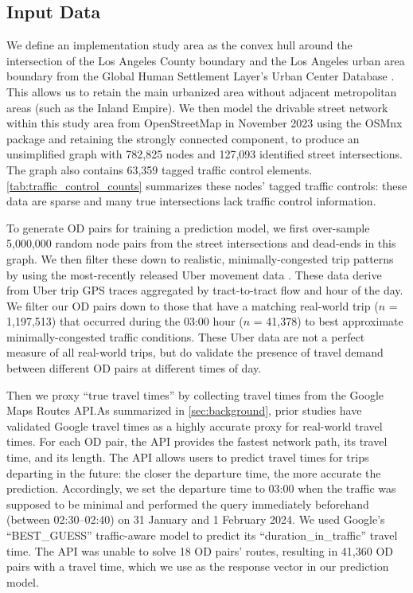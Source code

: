 \documentclass[12pt,letterpaper]{article} %
\begin{document}
\subsection{Input Data}

We define an implementation study area as the convex hull around the intersection of the Los Angeles County boundary and the Los Angeles urban area boundary from the Global Human Settlement Layer's Urban Center Database \citep{florczyk2019description, GHS2019}. This allows us to retain the main urbanized area without adjacent metropolitan areas (such as the Inland Empire). We then model the drivable street network within this study area from OpenStreetMap in November 2023 using the OSMnx package \citep{boeing_modeling_2025} and retaining the strongly connected component, to produce an unsimplified graph with 782,825 nodes and 127,093 identified street intersections. The graph also contains 63,359 tagged traffic control elements. \autoref{tab:traffic_control_counts} summarizes these nodes' tagged traffic controls: these data are sparse and many true intersections lack traffic control information.

To generate OD pairs for training a prediction model, we first over-sample 5,000,000 random node pairs from the street intersections and dead-ends in this graph. We then filter these down to realistic, minimally-congested trip patterns by using the most-recently released Uber movement data \citep{ubermovement2020}. These data derive from Uber trip GPS traces aggregated by tract-to-tract flow and hour of the day. We filter our OD pairs down to those that have a matching real-world trip ($n$ = 1,197,513) that occurred during the 03:00 hour ($n$ = 41,378) to best approximate minimally-congested traffic conditions. These Uber data are not a perfect measure of all real-world trips, but do validate the presence of travel demand between different OD pairs at different times of day.

Then we proxy \enquote{true travel times} by collecting travel times from the Google Maps Routes API.\@ As summarized in \autoref{sec:background}, prior studies have validated Google travel times as a highly accurate proxy for real-world travel times. For each OD pair, the API provides the fastest network path, its travel time, and its length. The API allows users to predict travel times for trips departing in the future: the closer the departure time, the more accurate the prediction. Accordingly, we set the departure time to 03:00 when the traffic was supposed to be minimal and performed the query immediately beforehand (between 02:30--02:40) on 31 January and 1 February 2024. We used Google's \enquote{BEST\_GUESS} traffic-aware model to predict its \enquote{duration\_in\_traffic} travel time. The API was unable to solve 18 OD pairs' routes, resulting in 41,360 OD pairs with a travel time, which we use as the response vector in our prediction model.
\end{document}
